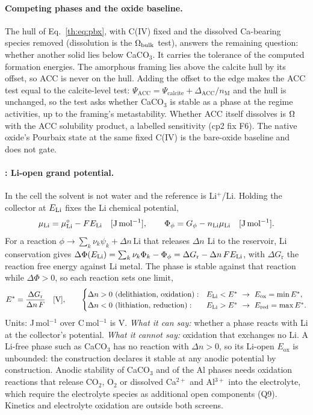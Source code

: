 \paragraph{Competing phases and the oxide baseline.} The hull of Eq.~\eqref{th:eq:pbx}, with
C(IV) fixed and the dissolved Ca-bearing species removed (dissolution is the $\Omega_\mathrm{bulk}$ test), answers
the remaining question: whether another solid lies below CaCO$_3$. It carries the tolerance of the
computed formation energies. The amorphous framing lies above the calcite hull by its offset, so
ACC is never on the hull. Adding the offset to the edge makes the ACC test equal to the
calcite-level test: $\Psi_\mathrm{ACC}=\Psi_\mathrm{calcite}+\Delta_\mathrm{ACC}/n_\mathrm{M}$ and
the hull is unchanged, so the test asks whether CaCO$_3$ is stable as a phase at the regime
activities, up to the framing's metastability. Whether ACC itself dissolves is $\Omega$ with the ACC
solubility product, a labelled sensitivity (cp2 fix F6). The native oxide's Pourbaix state at the
same fixed C(IV) is the bare-oxide baseline and does not gate.

\paragraph{\Rc: Li-open grand potential.} In the cell the solvent is not water and the reference
is Li$^+$/Li. Holding the collector at $E_\mathrm{Li}$ fixes the Li chemical potential,
\begin{equation}\label{th:eq:muli}
\mu_\mathrm{Li}=\mu_\mathrm{Li}^{\circ}-FE_\mathrm{Li} \quad[\mathrm{J\,mol^{-1}}],\qquad \Phi_\phi=G_\phi-n_\mathrm{Li}\mu_\mathrm{Li} \quad[\mathrm{J\,mol^{-1}}].
\end{equation}
For a reaction $\phi\to\sum_k\nu_k\psi_k+\Delta n\,\mathrm{Li}$ that releases $\Delta n$ Li to the
reservoir, Li conservation gives
$\Delta\Phi(E_\mathrm{Li})=\sum_k\nu_k\Phi_k-\Phi_\phi=\Delta G_\mathrm{r}-\Delta n\,FE_\mathrm{Li}$, with
$\Delta G_\mathrm{r}$ the reaction free energy against Li metal. The phase is stable against
that reaction while $\Delta\Phi>0$, so each reaction sets one limit,
\begin{equation}\label{th:eq:window}
E^{*}=\frac{\Delta G_\mathrm{r}}{\Delta n\,\Fc} \un{V},\qquad
\begin{cases}\Delta n>0\ (\text{delithiation, oxidation}): & \ELi<E^{*}\ \to\ E_\mathrm{ox}=\min E^{*},\\
\Delta n<0\ (\text{lithiation, reduction}): & \ELi>E^{*}\ \to\ E_\mathrm{red}=\max E^{*}.\end{cases}
\end{equation}
Units: J\,mol$^{-1}$ over C\,mol$^{-1}$ is V. \emph{What it can say:} whether a phase reacts with
Li at the collector's potential. \emph{What it cannot say:} oxidation that exchanges no Li. A
Li-free phase such as CaCO$_3$ has no reaction with $\Delta n>0$, so its Li-open $E_\mathrm{ox}$ is
unbounded: the construction declares it stable at any anodic potential by construction. Anodic
stability of CaCO$_3$ and of the Al phases needs oxidation reactions that release CO$_2$, O$_2$ or
dissolved Ca$^{2+}$ and Al$^{3+}$ into the electrolyte, which require the electrolyte species as
additional open components (Q9). Kinetics and electrolyte oxidation are outside both screens.

